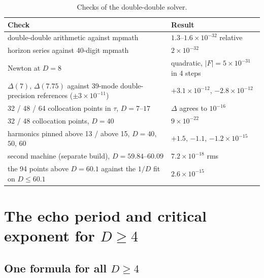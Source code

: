 \documentclass[aps,prd,onecolumn,superscriptaddress,nofootinbib,10pt]{revtex4-2}
\begin{document}
\begin{table}[htbp]
\caption{Checks of the double-double solver.}
\label{tab:checks}
\footnotesize
\begin{ruledtabular}
\begin{tabular}{ll}
Check & Result \\ \hline
double-double arithmetic against mpmath & $1.3$--$1.6\times10^{-32}$ relative \\
horizon series against 40-digit mpmath & $2\times10^{-32}$ \\
Newton at $D = 8$ & quadratic, $|F| = 5\times10^{-31}$ in 4 steps \\
$\Delta(7)$, $\Delta(7.75)$ against 39-mode double-precision references ($\pm3\times10^{-11}$) & $+3.1\times10^{-12}$, $-2.8\times10^{-12}$ \\
32 / 48 / 64 collocation points in $\tau$, $D = 7$--$17$ & $\Delta$ agrees to $10^{-16}$ \\
32 / 48 collocation points, $D = 40$ & $9\times10^{-22}$ \\
harmonics pinned above 13 / above 15, $D = 40$, $50$, $60$ & $+1.5$, $-1.1$, $-1.2\times10^{-15}$ \\
second machine (separate build), $D = 59.84$--$60.09$ & $7.2\times10^{-18}$ rms \\
the 94 points above $D = 60.1$ against the $1/D$ fit on $D \le 60.1$ & $2.6\times10^{-15}$ \\
\end{tabular}
\end{ruledtabular}
\end{table}

\section{The echo period and critical exponent for $D \ge 4$}
\label{sec:results}

\subsection{One formula for all $D \ge 4$}
\end{document}
